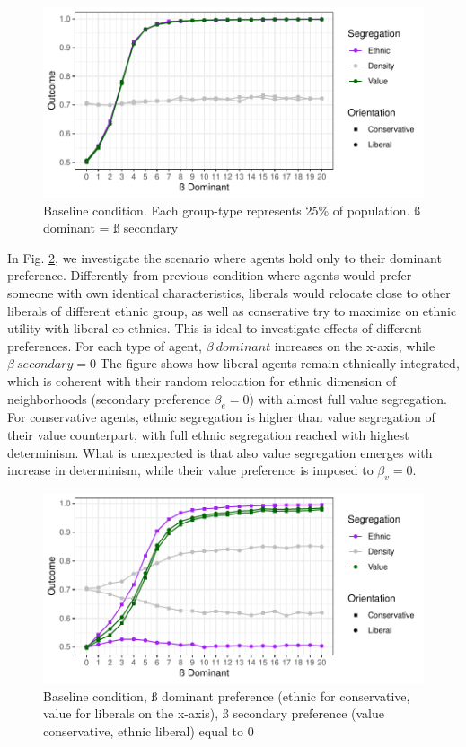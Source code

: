 \documentclass[
]{article}
\begin{document}
\begin{figure}[H]

{\centering \includegraphics[width=0.8\linewidth]{ev_rum_files/figure-latex/bsl-1} 

}

\caption{Baseline condition. Each group-type represents 25\% of population. ß dominant = ß secondary}\label{fig:bsl}
\end{figure}

In Fig. \ref{fig:bsl_dom}, we investigate the scenario where agents hold
only to their dominant preference. Differently from previous condition
where agents would prefer someone with own identical characteristics,
liberals would relocate close to other liberals of different ethnic
group, as well as conserative try to maximize on ethnic utility with
liberal co-ethnics. This is ideal to investigate effects of different
preferences. For each type of agent, \(\beta\ dominant\) increases on
the x-axis, while \(\beta\ secondary = 0\) The figure shows how liberal
agents remain ethnically integrated, which is coherent with their random
relocation for ethnic dimension of neighborhoods (secondary preference
\(\beta_e = 0\)) with almost full value segregation. For conservative
agents, ethnic segregation is higher than value segregation of their
value counterpart, with full ethnic segregation reached with highest
determinism. What is unexpected is that also value segregation emerges
with increase in determinism, while their value preference is imposed to
\(\beta_v = 0\).

\begin{figure}[H]

{\centering \includegraphics[width=0.8\linewidth]{ev_rum_files/figure-latex/bsl_dom-1} 

}

\caption{Baseline condition, ß dominant preference (ethnic for conservative, value for liberals on the x-axis), ß secondary preference (value conservative, ethnic liberal) equal to 0}\label{fig:bsl_dom}
\end{figure}
\end{document}
